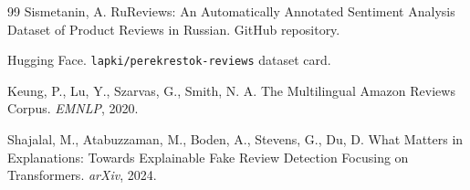 \documentclass[12pt,a4paper]{article}
\begin{document}
\begin{thebibliography}{99}
Sismetanin, A. RuReviews: An Automatically Annotated Sentiment Analysis Dataset of Product Reviews in Russian. GitHub repository.

Hugging Face. \texttt{lapki/perekrestok-reviews} dataset card.

Keung, P., Lu, Y., Szarvas, G., Smith, N. A. The Multilingual Amazon Reviews Corpus. \textit{EMNLP}, 2020.

Shajalal, M., Atabuzzaman, M., Boden, A., Stevens, G., Du, D. What Matters in Explanations: Towards Explainable Fake Review Detection Focusing on Transformers. \textit{arXiv}, 2024.

\end{thebibliography}
\end{document}
